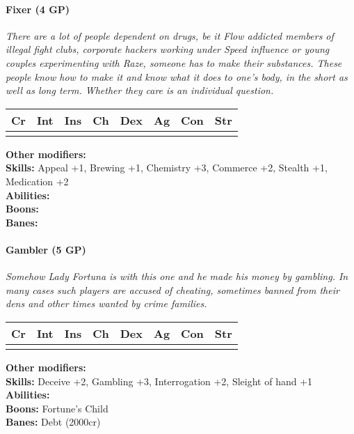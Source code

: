 \paragraph*{Fixer (4 GP)}
\textit{There are a lot of people dependent on drugs, be it Flow addicted members of illegal fight clubs, corporate hackers working under Speed influence or young couples experimenting with Raze, someone has to make their substances. These people know how to make it and know what it does to one's body, in the short as well as long term. Whether they care is an individual question.}\par
\begin{tabular}{|l|l|l|l|l|l|l|l|}
	\hline
	Cr & Int & Ins & Ch & Dex & Ag & Con & Str \\ \hline
	&  &  &  &  &  &  &  \\ \hline
\end{tabular}\par
\noindent\textbf{Other modifiers:} \\
\textbf{Skills:} Appeal +1,
Brewing +1,
Chemistry +3,
Commerce +2,
Stealth +1,
Medication +2\\
\textbf{Abilities:} \\
\textbf{Boons:} \\
\textbf{Banes:} \\

\hrulefill
\paragraph*{Gambler (5 GP)}
\textit{Somehow Lady Fortuna is with this one and he made his money by gambling. In many cases such players are accused of cheating, sometimes banned from their dens and other times wanted by crime families.}\par
\begin{tabular}{|l|l|l|l|l|l|l|l|}
	\hline
	Cr & Int & Ins & Ch & Dex & Ag & Con & Str \\ \hline
	&  &  &  &  &  &  &  \\ \hline
\end{tabular}\par
\noindent\textbf{Other modifiers:} \\
\textbf{Skills:} Deceive +2,
Gambling +3,
Interrogation +2,
Sleight of hand +1\\
\textbf{Abilities:} \\
\textbf{Boons:} Fortune's Child\\
\textbf{Banes:} Debt (2000cr)\\

